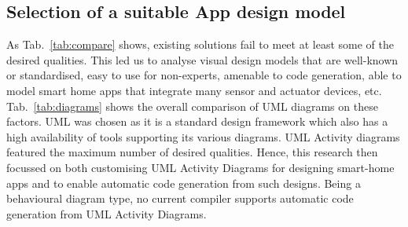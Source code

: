 \subsection{Selection of a suitable App design model}

As Tab.~\ref{tab:compare} shows, existing solutions fail to meet at least some of the desired qualities. This led us to analyse visual design models that are well-known or standardised, easy to use for non-experts, amenable to code generation, able to model smart home apps that integrate many sensor and actuator devices, etc. Tab.~\ref{tab:diagrams} shows the overall comparison of UML diagrams on these factors. UML was chosen as it is a standard design framework which also has a high availability of tools supporting its various diagrams. UML Activity diagrams featured the maximum number of desired qualities. Hence, this research then focussed on both customising UML Activity Diagrams for designing smart-home apps and to enable automatic code generation from such designs. Being a behavioural diagram type, no current compiler supports automatic code generation from UML Activity Diagrams.



